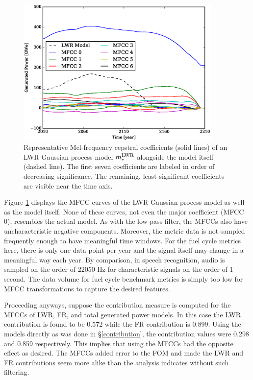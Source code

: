 \begin{figure}[htb]
\centering
\includegraphics[width=0.9\textwidth]{mfcc-lwr-model.eps}
\caption{Representative Mel-frequency cepstral coefficients (solid lines) of 
an LWR Gaussian process model $m_*^{\mathrm{LWR}}$ alongside the model itself (dashed 
line). The first seven coefficients are labeled in order of decreasing 
significance.  The remaining, least-significant coefficients are visible
near the time axis.}
\label{mfcc-lwr-model}
\end{figure}

Figure \ref{mfcc-lwr-model} displays the MFCC curves of the LWR Gaussian 
process model as well as the model itself. None of these curves, not even the 
major coefficient (MFCC 0), resembles the actual model.
As with the low-pass filter, the MFCCs also have 
uncharacteristic negative components.  Moreover, 
the metric data is not sampled frequently enough to have meaningful
time windows. For the fuel cycle metrics here, there is only one data point per year 
and the signal itself may change in a meaningful way each year. By comparison, 
in speech recognition, audio is sampled on the order of 22050 Hz 
\cite{EBUTECH3285,juang1991hidden} for characteristic 
signals on the order of 1 second.  The data volume for fuel cycle benchmark metrics
is simply too low for MFCC transformations to capture the desired features. 

Proceeding anyways, suppose the contribution measure is computed for the MFCCs 
of LWR, FR, and 
total generated power models.  In this case the LWR contribution is found to be 
0.572 while the FR contribution is 0.899. Using the models directly as was done 
in \S\ref{contribution}, the contribution values were 0.298 and 0.859 respectively.
This implies that using the MFCCs had the opposite effect as desired.  The MFCCs
added error to the FOM and made the LWR and FR contributions seem more alike 
than the analysis indicates without such filtering.

